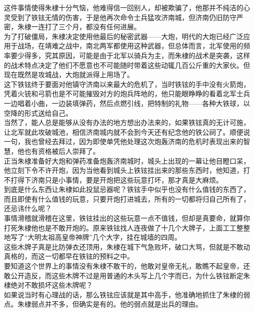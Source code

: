 \begin{multicols}{\theparacolNo}
这件事情使得朱棣十分气恼，他难得信一回别人，却被欺骗了，他那并不纯洁的心灵受到了铁铉无情的伤害，于是他再次命令士兵猛攻济南城，但济南仍旧防守严密，朱棣一连打了三个月，都没有任何进展。\\

为了打破僵局，朱棣决定使用他最后的秘密武器——大炮，明代的大炮已经广泛应用于战场，在靖难之战中，南北两军都使用这种武器，但总体而言，北军使用的频率要少得多，究其原因，可能是由于北军以骑兵为主，而朱棣的战术是突袭，这样的战术特点决定了他们不愿意也不可能随时带着这些动辄几百公斤重的大家伙。但现在既然是攻城战，大炮就派得上用场了。\\

这下铁铉终于要面对他镇守济南以来最大的危机了，当时铁铉的手中没有火箭炮，凭着火铳和弓箭也是不可能摧毁对方的炮兵阵地的，他只能眼睁睁的看着北军士兵一边唱着小曲，一边装填弹药，然后点燃引线，把特制的礼物——各种大铁球，以空降的形式送给自己。\\

当然了，能人总是能够从没有办法的地方想出办法来的，如果铁铉真的无计可施，让北军就此攻破城池，相信济南城内就不会到今天还有纪念他的铁公祠了。顺便说一句，我也曾经去拜过，因为即使单凭他处理这次炮轰济南的危机时表现出来的智慧，他也有资格被后人崇拜了。\\

正当朱棣准备好大炮和弹药准备炮轰济南城时，城头上出现的一幕让他目瞪口呆，他立刻下令不许开炮，因为当他看到城头上铁铉挂出来的那些东西时，他知道，打不打得下济南只是小事情，要是开炮把这些玩意打坏，那才真是大麻烦。\\

到底是什么东西让朱棣如此投鼠忌器呢？铁铉手中似乎也没有什么值钱的东西了，而且即使有什么值钱的玩意，只要开炮打进城去，所有的一切都将归自己所有了，还忌讳什么呢？\\

事情滑稽就滑稽在这里，铁铉挂出的这些玩意一点不值钱，但却是真要命，就算你打死朱棣他也是不敢开炮的。原来铁铉找人连夜做了十几个大牌子，上面工工整整地写了“大明太祖高皇帝神牌”几个大字，挂在城墙的四周。\\

这些木牌子真是比防弹衣还顶用，朱棣在城下气急败坏，破口大骂，但就是不敢动真格的，而这一切都早在铁铉的预料之中。\\

要知道这个世界上的事情没有朱棣不敢干的，他敢对皇帝无礼，敢瞧不起皇帝，还敢公开造反，而这些木牌不过是用普通的木头写上几个字而已，为什么铁铉断定朱棣绝对不敢损坏这些木牌呢？\\

如果说当时有心理战的话，那么铁铉应该就是其中高手，他准确地抓住了朱棣的弱点。朱棣弱点并不多，但确实是有的。他的弱点就是出兵的理由。\\


\end{multicols}
